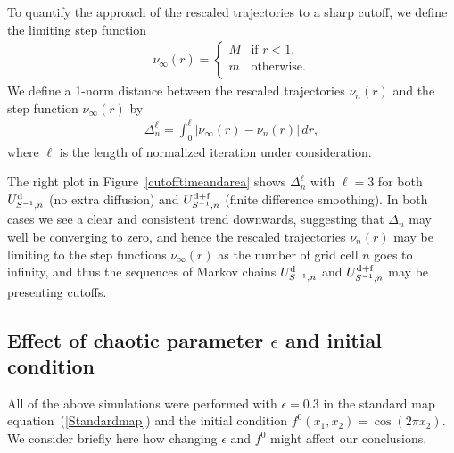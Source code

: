 \documentclass{aims}
\theoremstyle{definition}
\begin{document}
To quantify the approach of the rescaled trajectories to a sharp
cutoff, we define the limiting step function
\begin{eqnarray}
   \label{limittraj}
   \nu_{\infty}(r) = \begin{cases}
                     M &\text{if } r<1, \\
                     m &\text{otherwise}. \\
                     \end{cases} 
\end{eqnarray}
We define a 1-norm distance between the rescaled trajectories
$\nu_n(r)$ and the step function $\nu_\infty(r)$ by
\begin{eqnarray}
    \label{trajdistance}
    \Delta_n^\ell = \int_0^\ell |\nu_{\infty}(r)-\nu_{n}(r)|\,dr,
\end{eqnarray}
where $\ell$ is the length of normalized iteration under
consideration.

The right plot in Figure~\ref{cutofftimeandarea} shows $\Delta_n^\ell$
with $\ell = 3$ for both $U_{S^{-1},n}^{\rm d}$ (no extra diffusion)
and $U_{S^{-1},n}^{\rm d+f}$ (finite difference smoothing). In both
cases we see a clear and consistent trend downwards, suggesting that
$\Delta_n$ may well be converging to zero, and hence the rescaled
trajectories $\nu_n(r)$ may be limiting to the step functions
$\nu_\infty(r)$ as the number of grid cell $n$ goes to infinity, and
thus the sequences of Markov chains $U_{S^{-1},n}^{\rm d}$ and
$U_{S^{-1},n}^{\rm d+f}$ may be presenting cutoffs.

\subsection{Effect of chaotic parameter $\epsilon$ and initial condition}
\label{sec:effect-chaot-param}

All of the above simulations were performed with $\epsilon = 0.3$ in
the standard map equation~(\ref{Standardmap}) and the initial
condition $f^0(x_1,x_2) = \cos(2\pi x_2)$. We consider briefly here
how changing $\epsilon$ and $f^0$ might affect our conclusions.
\end{document}
